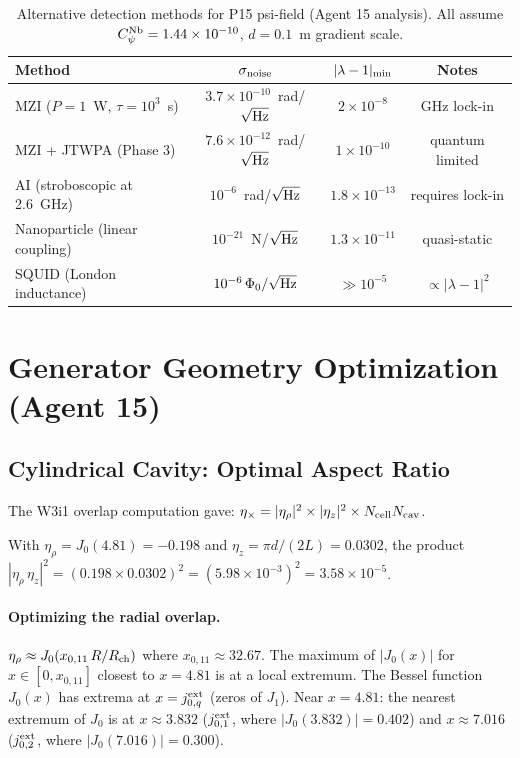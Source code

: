\documentclass[11pt]{article}
\newcommand{\ee}[1]{\times 10^{#1}}
\begin{document}
\begin{table}[h]
\centering
\caption{Alternative detection methods for P15 psi-field (Agent 15 analysis).
All assume $C_\psi^{\rm Nb} = 1.44\ee{-10}$, $d = 0.1$~m gradient scale.}
\label{tab:a15-alternatives}
\begin{tabular}{lccc}
\toprule
Method & $\sigma_{\rm noise}$ & $|\lambda-1|_{\rm min}$ & Notes \\
\midrule
MZI ($P = 1$~W, $\tau = 10^3$~s) & $3.7\ee{-10}$~rad/$\sqrt{\rm Hz}$ & $2\ee{-8}$ & GHz lock-in \\
MZI + JTWPA (Phase 3) & $7.6\ee{-12}$~rad/$\sqrt{\rm Hz}$ & $1\ee{-10}$ & quantum limited \\
AI (stroboscopic at 2.6~GHz) & $10^{-6}$~rad/$\sqrt{\rm Hz}$ & $1.8\ee{-13}$ & requires lock-in \\
Nanoparticle (linear coupling) & $10^{-21}$~N/$\sqrt{\rm Hz}$ & $1.3\ee{-11}$ & quasi-static \\
SQUID (London inductance) & $10^{-6}\,\Phi_0/\sqrt{\rm Hz}$ & $\gg 10^{-5}$ & $\propto |\lambda-1|^2$ \\
\bottomrule
\end{tabular}
\end{table}

\section{Generator Geometry Optimization (Agent 15)}
\label{sec:a15-geometry}

\subsection{Cylindrical Cavity: Optimal Aspect Ratio}

The W3i1 overlap computation gave:
$\eta_\times = |\eta_\rho|^2 \times |\eta_z|^2 \times N_{\rm cell} N_{\rm cav}$.

With $\eta_\rho = J_0(4.81) = -0.198$ and $\eta_z = \pi d/(2L) = 0.0302$,
the product $|\eta_\rho\,\eta_z|^2 = (0.198 \times 0.0302)^2 = (5.98\ee{-3})^2 = 3.58\ee{-5}$.

\paragraph{Optimizing the radial overlap.}

$\eta_\rho \approx J_0(x_{0,11}\,R/R_{\rm ch})$ where $x_{0,11} \approx 32.67$.
The maximum of $|J_0(x)|$ for $x \in [0, x_{0,11}]$ closest to $x = 4.81$ is at
a local extremum. The Bessel function $J_0(x)$ has extrema at $x = j_{0,q}^{\rm ext}$
(zeros of $J_1$). Near $x = 4.81$: the nearest extremum of $J_0$ is at $x \approx 3.832$
($j_{0,1}^{\rm ext}$, where $|J_0(3.832)| = 0.402$) and $x \approx 7.016$
($j_{0,2}^{\rm ext}$, where $|J_0(7.016)| = 0.300$).
\end{document}
